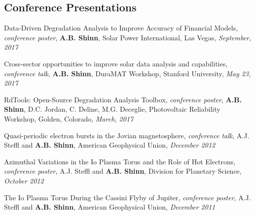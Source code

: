 \documentclass[margin,line]{res}
\newenvironment{list2}{
  \begin{list}{$\cdot$}{%
      \setlength{\itemsep}{0in}
      \setlength{\parsep}{0in} \setlength{\parskip}{0in}
      \setlength{\topsep}{0in} \setlength{\partopsep}{0in} 
      \setlength{\leftmargin}{0.2in}}}{\end{list}}
\begin{document}
\begin{resume}
% 
% 
% 


\section{\sc Conference Presentations}

Data-Driven Degradation Analysis to Improve Accuracy of Financial Models, {\it conference poster}, {\bf A.B. Shinn}, Solar Power International, Las Vegas, {\it September, 2017}

Cross-sector opportunities to improve solar data analysis and capabilities, {\it conference talk}, {\bf A.B. Shinn}, DuraMAT Workshop, Stanford University, {\it May 23, 2017}

RdTools: Open-Source Degradation Analysis Toolbox, {\it conference poster}, {\bf A.B. Shinn}, D.C. Jordan, C. Deline, M.G. Deceglie, Photovoltaic Reliability Workshop, Golden, Colorado, {\it March, 2017}

Quasi-periodic electron bursts in the Jovian magnetosphere, {\it conference talk}, A.J. Steffl and {\bf A.B. Shinn}, American Geophysical Union, {\it December 2012}

Azimuthal Variations in the Io Plasma Torus and the Role of Hot Electrons, {\it conference poster}, A.J. Steffl and {\bf A.B. Shinn}, Division for Planetary Science, {\it October 2012}

The Io Plasma Torus During the Cassini Flyby of Jupiter, {\it conference poster}, A.J. Steffl and {\bf A.B. Shinn}, American Geophysical Union, {\it December 2011}


\end{resume}
\end{document}

